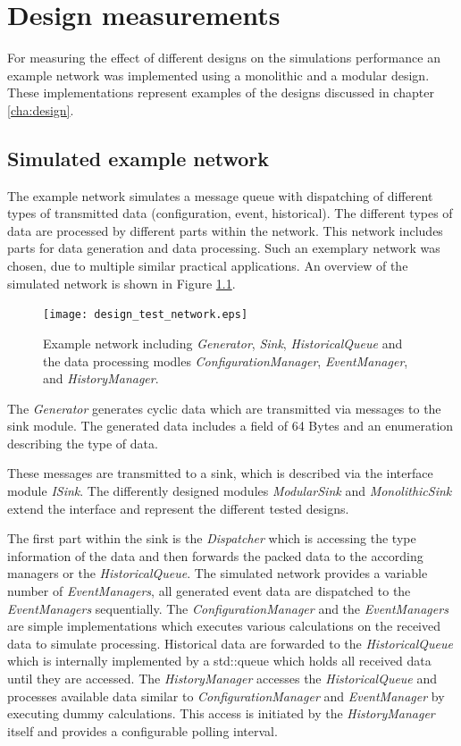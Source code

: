 \chapter{Design measurements}
\label{cha:measurements}
For measuring the effect of different designs on the simulations performance an example network was implemented using a monolithic and a modular design.
These implementations represent examples of the designs discussed in chapter \ref{cha:design}.


\section{Simulated example network}
\label{sec:measurements_network}
The example network simulates a message queue with dispatching of different types of transmitted data (configuration, event, historical).
The different types of data are processed by different parts within the network.
This network includes parts for data generation and data processing.
Such an exemplary network was chosen, due to multiple similar practical applications.
An overview of the simulated network is shown in Figure \ref{fig:design_test_network}.

\begin{figure}
    \centering
    \texttt{[image: design\_test\_network.eps]}
    \caption{Example network including \emph{Generator}, \emph{Sink}, \emph{HistoricalQueue} and the data processing modles \emph{ConfigurationManager}, \emph{EventManager}, and \emph{HistoryManager}.}
    \label{fig:design_test_network}
\end{figure}

The \emph{Generator} generates cyclic data which are transmitted via messages to the sink module.
The generated data includes a field of 64 Bytes and an enumeration describing the type of data.

These messages are transmitted to a sink, which is described via the interface module \emph{ISink}.
The differently designed modules \emph{ModularSink} and \emph{MonolithicSink} extend the interface and represent the different tested designs.

The first part within the sink is the \emph{Dispatcher} which is accessing the type information of the data and then forwards the packed data to the according managers or the \emph{HistoricalQueue}.
The simulated network provides a variable number of \emph{EventManagers}, all generated event data are dispatched to the \emph{EventManagers} sequentially.
The \emph{ConfigurationManager} and the \emph{EventManagers} are simple implementations which executes various calculations on the received data to simulate processing.
Historical data are forwarded to the \emph{HistoricalQueue} which is internally implemented by a std::queue which holds all received data until they are accessed.
The \emph{HistoryManager} accesses the \emph{HistoricalQueue} and processes available data similar to \emph{ConfigurationManager} and \emph{EventManager} by executing dummy calculations.
This access is initiated by the \emph{HistoryManager} itself and provides a configurable polling interval.
\\

